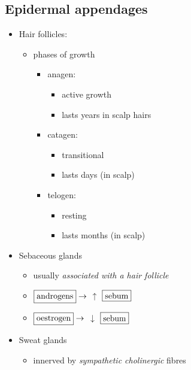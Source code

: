\documentclass[
  12pt,
]{memoir}
\providecommand{\tightlist}{%
  \setlength{\itemsep}{0pt}\setlength{\parskip}{0pt}}
\begin{document}
\hypertarget{epidermal-appendages}{%
\subsection{Epidermal appendages}\label{epidermal-appendages}}

\begin{itemize}
\tightlist
\item
  Hair follicles:

  \begin{itemize}
  \tightlist
  \item
    phases of growth

    \begin{itemize}
    \tightlist
    \item
      anagen:

      \begin{itemize}
      \tightlist
      \item
        active growth
      \item
        lasts years in scalp hairs
      \end{itemize}
    \item
      catagen:

      \begin{itemize}
      \tightlist
      \item
        transitional
      \item
        lasts days (in scalp)
      \end{itemize}
    \item
      telogen:

      \begin{itemize}
      \tightlist
      \item
        resting
      \item
        lasts months (in scalp)
      \end{itemize}
    \end{itemize}
  \end{itemize}
\item
  Sebaceous glands

  \begin{itemize}
  \tightlist
  \item
    usually \emph{associated with a hair follicle}
  \item
    \(\fbox{androgens}\rightarrow\) \textbf{\(\uparrow\)}
    \(\fbox{sebum}\)
  \item
    \(\fbox{oestrogen}\rightarrow\) \textbf{\(\downarrow\)}
    \(\fbox{sebum}\)
  \end{itemize}
\item
  Sweat glands

  \begin{itemize}
  \tightlist
  \item
    innerved by \emph{sympathetic cholinergic} fibres
  \end{itemize}
\end{itemize}
\end{document}
